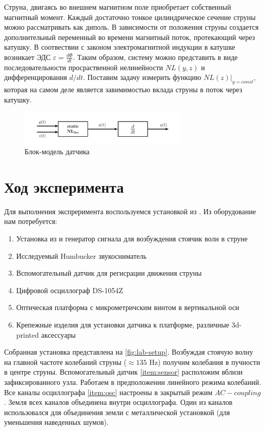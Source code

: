 \documentclass{article}
\begin{document}
Струна, двигаясь во внешнем магнитном поле приобретает собственный магнитный момент.
Каждый достаточно тонкое цилиндрическое сечение струны можно рассматривать как диполь. В зависимости от положения струны
создается дополнительный переменный во времени магнитный поток, протекающий через катушку. В соотвествии с законом
электромагнитной индукции в катушке возникает ЭДС $\varepsilon = \frac{d\Phi}{dt}$. Таким образом, систему можно
представить в виде последовательности просраственной нелинейности $NL(y, z)$ и дифференцирования $d/dt$. Поставим задачу
измерить функцию $NL(z)\vert_{y = const}$, которая на самом деле является завимимостью вклада струны в поток через катушку.

\begin{figure}[h]
    \centering
    \includegraphics[width=8cm]{drawings/model.png}
    \caption{Блок-модель датчика}
    \label{fig:model}
\end{figure}

\section{Ход эксперимента}

Для выполнения экспреримента воспользуемся установкой из \cite{string-lab}. Из оборудование нам потребуется:

\begin{enumerate}
    \item Установка из \cite{string-lab} и генератор сигнала для возбуждения стоячик волн в струне \label{item:generator}
    \item Исследуемый Humbucker звукосниматель
    \item Вспомогательный датчик для регисрации движения струны \label{item:sensor}
    \item Цифровой осциллограф DS-1054Z \label{item:osc}
    \item Оптическая платформа с микрометричским винтом в вертикальной оси
    \item Крепежные изделия для установки датчика к платформе, различные 3d-printed аксессуары
\end{enumerate}

Собранная установка представлена на \ref{fig:lab-setup}.
Возбуждая стоячую волну на главной частоте колебаний струны ($\approx 135$ Hz) получим колебания в пучности в центре струны.
Вспомогательный датчик \ref{item:sensor} расположим вблизи зафиксированного узла. Работаем в предположении линейного режима
колебаний. Все каналы осциллографа \ref{item:osc} настроены в закрытый режим $AC-coupling$. Земля всех каналов объединена внутри
осциллографа. Один из каналов использовался для объединения земли с металлической установкой (для уменьшения наведенных шумов).
\end{document}
